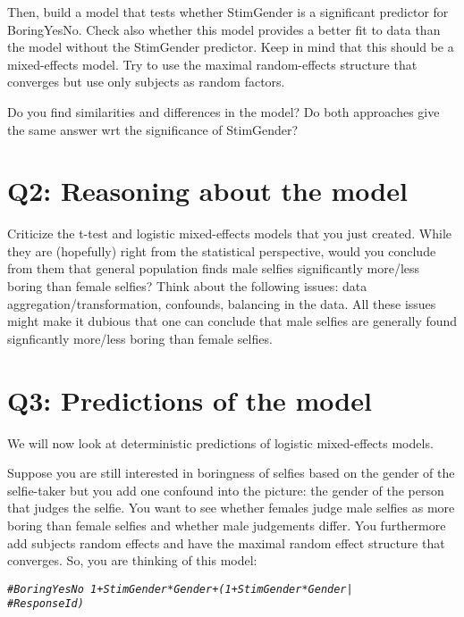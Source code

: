 \documentclass{article}\usepackage[]{graphicx}\usepackage[]{color}
\makeatletter
\newcommand{\hlcom}[1]{\textcolor[rgb]{0.678,0.584,0.686}{\textit{#1}}}%
\newenvironment{kframe}{%
 \def\at@end@of@kframe{}%
 \ifinner\ifhmode%
  \def\at@end@of@kframe{\end{minipage}}%
  \begin{minipage}{\columnwidth}%
 \fi\fi%
 \def\FrameCommand##1{\hskip\@totalleftmargin \hskip-\fboxsep
 \colorbox{shadecolor}{##1}\hskip-\fboxsep
     \hskip-\linewidth \hskip-\@totalleftmargin \hskip\columnwidth}%
 \MakeFramed {\advance\hsize-\width
   \@totalleftmargin\z@ \linewidth\hsize
   \@setminipage}}%
 {\par\unskip\endMakeFramed%
 \at@end@of@kframe}
\newenvironment{knitrout}{}{} %
\makeatother
\begin{document}
Then, build a model that tests whether StimGender is a significant predictor for BoringYesNo. Check also whether this model provides a better fit to data than the model without the StimGender predictor. Keep in mind that this should be a mixed-effects model. Try to use the maximal random-effects structure that converges but use only subjects as random factors.

Do you find similarities and differences in the model? Do both approaches give the same answer wrt the significance of StimGender?

\section*{Q2: Reasoning about the model}

Criticize the t-test and logistic mixed-effects models that you just created. While they are (hopefully) right from the statistical perspective, would you conclude from them that general population finds male selfies significantly more/less boring than female selfies? Think about the following issues: data aggregation/transformation, confounds, balancing in the data. All these issues might make it dubious that one can conclude that male selfies are generally found signficantly more/less boring than female selfies.

\section*{Q3: Predictions of the model}

We will now look at deterministic predictions of logistic mixed-effects models.

Suppose you are still interested in boringness of selfies based on the gender of the selfie-taker but you add one confound into the picture: the gender of the person that judges the selfie. You want to see whether females judge male selfies as more boring than female selfies and whether male judgements differ. You furthermore add subjects random effects and have the maximal random effect structure that converges. So, you are thinking of this model:

\begin{knitrout}
\color{fgcolor}\begin{kframe}
\begin{alltt}
\hlcom{# BoringYesNo ~ 1 + StimGender*Gender + (1 + StimGender * Gender |}
\hlcom{# ResponseId )}
\end{alltt}
\end{kframe}
\end{knitrout}
\end{document}
